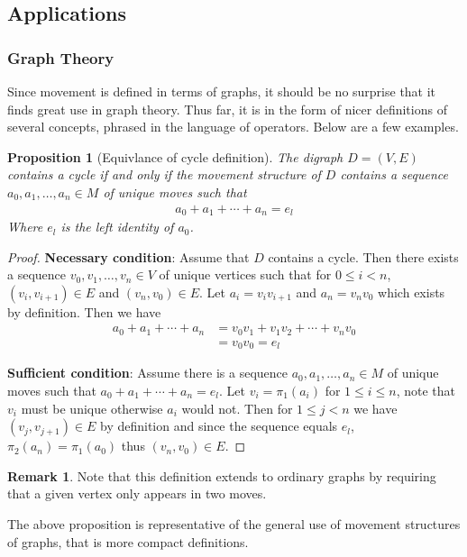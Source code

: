\documentclass{article}
\theoremstyle{plain}
\newtheorem{proposition}[theorem]{Proposition}
\theoremstyle{definition}
\newtheorem*{remark}{Remark}
\begin{document}
\subsection{Applications}
\subsubsection{Graph Theory}
Since movement is defined in terms of graphs, it should be no surprise
that it finds great use in graph theory. Thus far, it is in the form
of nicer definitions of several concepts, phrased in the language of
operators. Below are a few examples.
\begin{proposition}[Equivlance of cycle definition]\label{prop7}
	The digraph $D=(V,E)$ contains a cycle if and only if the movement
	structure of $D$ contains a sequence $a_0,a_1,\dots,a_n\in M$
	of unique moves such that
	\begin{equation}
	\begin{aligned}
		a_0+a_1+\cdots+a_n= e_l
	\end{aligned}
	\end{equation}
	Where $e_l$ is the left identity of $a_0$.
\end{proposition}
\begin{proof}
	\textbf{Necessary condition}: 
	Assume that $D$ contains a cycle. Then there exists a sequence
	$v_0,v_1, \dots,v_n \in V$ of unique vertices such that for $0\leq
	i < n$, $(v_i,v_{i+1}) \in E$ and $(v_n,v_0) \in E$. Let $a_i =
	v_iv_{i+1}$ and $a_n =v_n v_0$ which exists by definition. Then
	we have
	\begin{equation}
	\begin{aligned}
		a_0+a_1+\cdots + a_n &= v_0v_1+v_1v_2+\cdots+v_nv_0 \\
							 &= v_0v_0 = e_l
	\end{aligned}
	\end{equation}
	
	\textbf{Sufficient condition}: 
	Assume there is a sequence $a_0,a_1,\dots,a_n\in M$ of unique
	moves such that $a_0+a_1+\cdots+a_n= e_l$. Let $v_i = \pi_1(a_i)$
	for $1 \leq i \leq n$, note that $v_i$ must be unique otherwise
	$a_i$ would not. Then for $1 \leq j < n$ we have $(v_j,v_{j+1})
	\in E$ by definition and since the sequence equals $e_l$,
	$\pi_2(a_n) = \pi_1(a_0)$ thus $(v_n,v_0)\in E$.
\end{proof}
\begin{remark}
	Note that this definition extends to ordinary graphs by requiring that
	a given vertex only appears in two moves.
\end{remark}
The above proposition is representative of the general use of movement
structures of graphs, that is more compact definitions.
\end{document}
